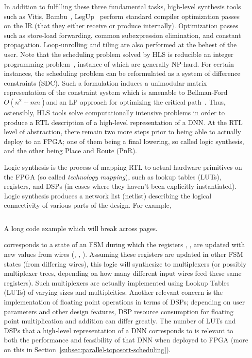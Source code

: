 In addition to fulfilling these three fundamental tasks, high-level synthesis tools such as Vitis, Bambu~\cite{ferrandi2021bambu}, LegUp~\cite{10.1145/2514740} perform standard compiler optimization passes on the IR (that they either receive or produce internally).
Optimization passes such as store-load forwarding, common subexpression elimination, and constant propagation.
Loop-unrolling and tiling are also performed at the behest of the user.
Note that the scheduling problem solved by HLS is reducible an integer programming problem~\cite{tuprints9272}, instance of which are generally NP-hard.
For certain instances, the scheduling problem can be reformulated as a system of difference constraints (SDC).
Such a formulation induces a unimodular matrix representation of the constraint system which is amenable to Bellman-Ford $O(n^2 + mn)$and an LP approach for optimizing the critical path~\cite{1688836}.
Thus, ostensibly, HLS tools solve computationally intensive problems in order to produce a RTL description of a high-level representation of a DNN.
At the RTL level of abstraction, there remain two more steps prior to being able to actually deploy to an FPGA; one of them being a final lowering, so called logic synthesis, and the other being Place and Route (PnR).

Logic synthesis is the process of mapping RTL to actual hardware primitives on the FPGA (so called \emph{technology mapping}), such as lookup tables (LUTs), registers, and DSPs (in cases where they haven't been explicitly instantiated).
Logic synthesis produces a network list (netlist) describing the logical connectivity of various parts of the design.
For example,
\begin{longlisting}
	\inputminted{verilog}{sources/always.v}
	\caption[Long Code Example]{A long code example which will break across pages.}
	\label{lst:long}
\end{longlisting}
\noindent corresponds to a state of an FSM during which the registers , ,  are updated with new values from wires (, , ).
Assuming these registers are updated in other FSM states (from differing wires), this logic will synthesize to multiplexers (or possibly multiplexer trees, depending on how many different input wires feed these same registers).
Such multiplexers are actually implemented using Lookup Tables (LUTs) of varying sizes and multiplcities.
Another relevant concern is the implementation of floating point operations in terms of DSPs; depending on user parameters and other design features, DSP resource consumption for floating point multiplication and addition can differ greatly.
The number of LUTs and DSPs that a high-level representation of a DNN corresponds to is relevant to both the performance and feasibility of that DNN when deployed to FPGA (more on this in Section~\ref{subsec:parallel-toposort-scheduling}).

